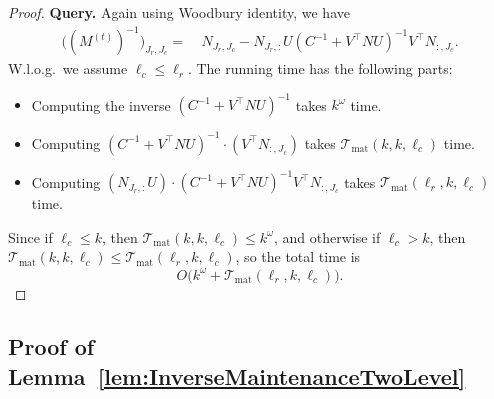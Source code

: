 \documentclass[11pt]{article}
\newcommand{\Tmat}{\mathcal{T}_{\mathrm{mat}}}
\newcommand\CC{\boldsymbol{\mathit{C}}}
\newcommand\NN{\boldsymbol{\mathit{N}}}
\newcommand\MM{\boldsymbol{\mathit{M}}}
\newcommand\UU{\boldsymbol{\mathit{U}}}
\newcommand\VV{\boldsymbol{\mathit{V}}}
\begin{document}
\begin{proof}
{\bf Query.} Again using Woodbury identity, we have 
\begin{align*}
\big((\MM^{(t)})^{-1} \big)_{J_r, J_c} = &~ \NN_{J_r, J_c} - \NN_{J_r, :} \UU (\CC^{-1} + \VV^{\top} \NN \UU )^{-1} \VV^{\top} \NN_{:, J_c}.
\end{align*}
W.l.o.g.~we assume $\ell_c \leq \ell_r$. The running time has the following parts:
\begin{itemize}
\item Computing the inverse $(\CC^{-1} + \VV^{\top} \NN \UU )^{-1}$ takes $k^{\omega}$ time.
\item Computing $(\CC^{-1} + \VV^{\top} \NN \UU )^{-1} \cdot (\VV^{\top} \NN_{:, J_c})$ takes $\Tmat(k, k, \ell_c)$ time.
\item Computing $(\NN_{J_r, :} \UU) \cdot (\CC^{-1} + \VV^{\top} \NN \UU )^{-1} \VV^{\top} \NN_{:, J_c}$ takes $\Tmat(\ell_r, k, \ell_c)$ time.
\end{itemize}
Since if $\ell_c \leq k$, then $\Tmat(k, k, \ell_c) \leq k^{\omega}$, and otherwise if $\ell_c > k$, then $\Tmat(k, k, \ell_c) \leq \Tmat(\ell_r, k, \ell_c)$, so the total time is
\[
O\big(k^{\omega} + \Tmat(\ell_r, k, \ell_c) \big).
\]
\end{proof}

\subsection*{Proof of Lemma~\ref{lem:InverseMaintenanceTwoLevel}}
\end{document}
